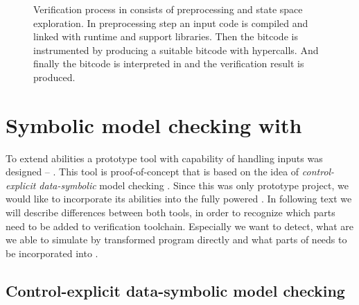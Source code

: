 \begin{figure}[!ht]
{
}
\caption{Verification process in \DIVINE consists of preprocessing and
state space exploration. In preprocessing step an input code is
compiled and linked with \DIOS runtime and \DIVINE support
libraries. Then the bitcode is instrumented by \LART producing a suitable \LLVM bitcode with \DIVM hypercalls. And finally the bitcode is interpreted in \DIVM and the verification result is produced.}\label{fig:verification}
\end{figure}

\section{Symbolic model checking with \SymDIVINE}\label{sub:symdivine}

To extend \DIVINE abilities a prototype tool with capability of handling inputs
was designed -- \SymDIVINE.  This tool is proof-of-concept that is based on the
idea of \emph{control-explicit data-symbolic} model checking \cite{Barnat14}.
Since this was only prototype project, we would like to incorporate its
abilities into the fully powered \DIVINE. In following text we will describe
differences between both tools, in order to recognize which parts need to be added
to \DIVINE verification toolchain. Especially we want to detect, what are we
able to simulate by transformed program directly and what parts of \SymDIVINE
needs to be incorporated into \DIVINE.

\subsection{Control-explicit data-symbolic model checking}

